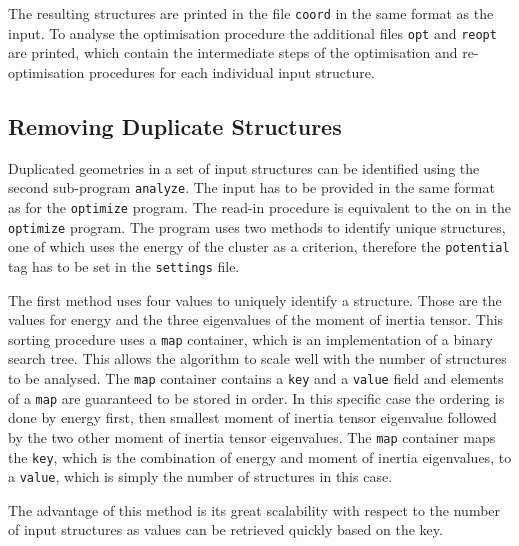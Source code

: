 The resulting structures are printed in the file \verb|coord| in the same
format as the input. To analyse the optimisation procedure the additional files
\verb|opt| and \verb|reopt| are printed, which contain the intermediate steps
of the optimisation and re-optimisation procedures for each individual input
structure.

\subsection{Removing Duplicate Structures}
\label{sec:analysingresults}

Duplicated geometries in a set of input structures can be identified using the
second sub-program \texttt{analyze}. The input has to be provided in the same
format as for the \texttt{optimize} program. The read-in procedure is
equivalent to the on in the \texttt{optimize} program. The program uses two
methods to identify unique structures, one of which uses the energy of the
cluster as a criterion, therefore the \texttt{potential} tag has to be set in
the \texttt{settings} file.

The first method uses four values to uniquely identify a structure. Those are
the values for energy and the three eigenvalues of the moment of inertia
tensor. This sorting procedure uses a \verb|map| container, which is an
implementation of a binary search tree. This allows the algorithm to scale well
with the number of structures to be analysed. The \verb|map| container contains a
\verb|key| and a \verb|value| field and elements of a \verb|map| are guaranteed
to be stored in order.\autocite{Stroustrup_programminglanguage_2000} In this
specific case the ordering is done by energy first, then smallest moment of
inertia tensor eigenvalue followed by the two other moment of inertia tensor
eigenvalues. The \texttt{map} container maps the \texttt{key}, which is the
combination of energy and moment of inertia eigenvalues, to a \texttt{value},
which is simply the number of structures in this case. 

The advantage of this method is its great scalability with respect to the
number of input structures as values can be retrieved quickly based on the
key.

